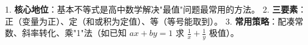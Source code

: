 \begin{summarybox}
1. \textbf{核心地位}：基本不等式是高中数学解决"最值"问题最常用的方法。
2. \textbf{三要素}：正（变量为正）、定（和或积为定值）、等（等号能取到）。
3. \textbf{常用策略}：配凑常数、斜率转化、乘"1"法（如已知 $ax+by=1$ 求 $\frac{1}{x}+\frac{1}{y}$ 极值）。
\end{summarybox}